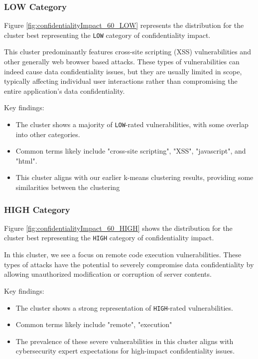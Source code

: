\documentclass[12pt]{article}
\begin{document}
\subsubsection*{LOW Category}

Figure \ref{fig:confidentialityImpact_60_LOW} represents the distribution for the cluster best representing the \texttt{LOW} category of confidentiality impact.


This cluster predominantly features cross-site scripting (XSS) vulnerabilities and other generally
web browser based attacks. These types of vulnerabilities can indeed cause data confidentiality issues, but
they are usually limited in scope, typically affecting individual user interactions rather than
compromising the entire application's data confidentiality.

Key findings:
\begin{itemize}

	\item The cluster shows a majority of \texttt{LOW}-rated vulnerabilities, with some overlap into
	      other categories.

	\item Common terms likely include "cross-site scripting", "XSS", "javascript", and "html".

	\item This cluster aligns with our earlier k-means clustering results, providing some
	      similarities between the clustering
\end{itemize}

\subsubsection*{HIGH Category}

Figure \ref{fig:confidentialityImpact_60_HIGH} shows the distribution for the cluster best representing the \texttt{HIGH} category of confidentiality impact.


In this cluster, we see a focus on remote code execution vulnerabilities. These
types of attacks have the potential to severely compromise data confidentiality by allowing unauthorized
modification or corruption of server contents.

Key findings:
\begin{itemize}

	\item The cluster shows a strong representation of \texttt{HIGH}-rated vulnerabilities.

	\item Common terms likely include "remote", "execution"

	\item The prevalence of these severe vulnerabilities in this cluster aligns with cybersecurity
	      expert expectations for high-impact confidentiality issues.

\end{itemize}
\end{document}

